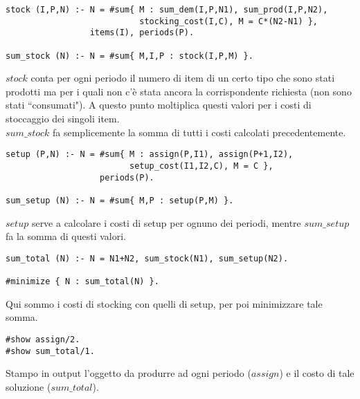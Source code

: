 \documentclass[12pt]{article}
\begin{document}
\begin{verbatim}
stock (I,P,N) :- N = #sum{ M : sum_dem(I,P,N1), sum_prod(I,P,N2),
                           stocking_cost(I,C), M = C*(N2-N1) },
                 items(I), periods(P).

sum_stock (N) :- N = #sum{ M,I,P : stock(I,P,M) }.
\end{verbatim}
$stock$ conta per ogni periodo il numero di item di un certo tipo che sono stati prodotti ma per i quali non c'è stata ancora la corrispondente richiesta (non sono stati ``consumati"). A questo punto moltiplica questi valori per i costi di stoccaggio dei singoli item.\\
$sum\_stock$ fa semplicemente la somma di tutti i costi calcolati precedentemente.

\begin{verbatim}
setup (P,N) :- N = #sum{ M : assign(P,I1), assign(P+1,I2),
                         setup_cost(I1,I2,C), M = C },
                   periods(P).

sum_setup (N) :- N = #sum{ M,P : setup(P,M) }.
\end{verbatim}
$setup$ serve a calcolare i costi di setup per ognuno dei periodi, mentre $sum\_setup$ fa la somma di questi valori.
\pagebreak

\begin{verbatim}
sum_total (N) :- N = N1+N2, sum_stock(N1), sum_setup(N2).

#minimize { N : sum_total(N) }.
\end{verbatim}
Qui sommo i costi di stocking con quelli di setup, per poi minimizzare tale somma.

\begin{verbatim}
#show assign/2.
#show sum_total/1.
\end{verbatim}
Stampo in output l'oggetto da produrre ad ogni periodo ($assign$) e il costo di tale soluzione ($sum\_total$).
\pagebreak
\end{document}
